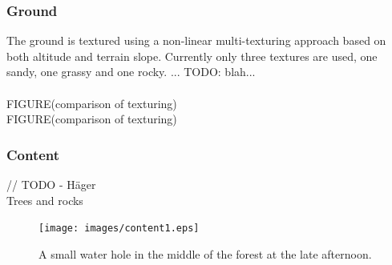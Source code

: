 \subsubsection{Ground}
The ground is textured using a non-linear multi-texturing approach based on both altitude and terrain slope. Currently only three textures are used, one sandy, one grassy and one rocky. ... TODO: blah...\\
\\
FIGURE(comparison of texturing)
\\
FIGURE(comparison of texturing)
\\

\subsubsection{Content}
// TODO - Häger \\
Trees and rocks 
\begin{figure}[H]
  \centering
  \texttt{[image: images/content1.eps]}
  \caption{A small water hole in the middle of the forest at the late afternoon.}
  \label{fig:water_hole}
\end{figure}%

